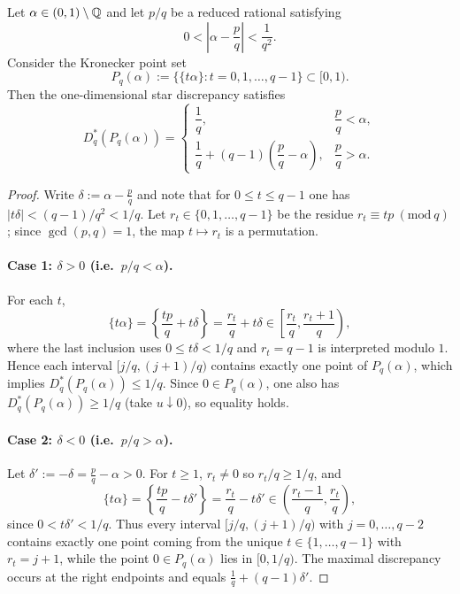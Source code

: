 \begin{proposition}
\label{prop:convergent_star_discrepancy}
Let $\alpha\in(0,1)\setminus\mathbb{Q}$ and let $p/q$ be a reduced rational satisfying
\begin{equation}
0<\left|\alpha-\frac{p}{q}\right|<\frac{1}{q^2}.
\end{equation}
Consider the Kronecker point set
\begin{equation}
P_q(\alpha):=\bigl\{\{t\alpha\}: t=0,1,\ldots,q-1\bigr\}\subset[0,1).
\end{equation}
Then the one-dimensional star discrepancy satisfies
\begin{equation}
D_q^*\!\left(P_q(\alpha)\right)=
\begin{cases}
\dfrac{1}{q}, & \dfrac{p}{q}<\alpha,\\[6pt]
\dfrac{1}{q}+(q-1)\!\left(\dfrac{p}{q}-\alpha\right), & \dfrac{p}{q}>\alpha.
\end{cases}
\end{equation}
\end{proposition}
\begin{proof}
Write $\delta:=\alpha-\frac{p}{q}$ and note that for $0\le t\le q-1$ one has $|t\delta|<(q-1)/q^2<1/q$.
Let $r_t\in\{0,1,\ldots,q-1\}$ be the residue $r_t\equiv tp\ (\mathrm{mod}\ q)$; since $\gcd(p,q)=1$, the map $t\mapsto r_t$ is a permutation.

\paragraph{Case 1: $\delta>0$ (i.e.\ $p/q<\alpha$).}
For each $t$,
\begin{equation}
\{t\alpha\}=\left\{\frac{tp}{q}+t\delta\right\}= \frac{r_t}{q}+t\delta \in \left[\frac{r_t}{q},\frac{r_t+1}{q}\right),
\end{equation}
where the last inclusion uses $0\le t\delta<1/q$ and $r_t=q-1$ is interpreted modulo $1$.
Hence each interval $[j/q,(j+1)/q)$ contains exactly one point of $P_q(\alpha)$, which implies $D_q^*(P_q(\alpha))\le 1/q$.
Since $0\in P_q(\alpha)$, one also has $D_q^*(P_q(\alpha))\ge 1/q$ (take $u\downarrow 0$), so equality holds.

\paragraph{Case 2: $\delta<0$ (i.e.\ $p/q>\alpha$).}
Let $\delta':=-\delta=\frac{p}{q}-\alpha>0$. For $t\ge 1$, $r_t\neq 0$ so $r_t/q\ge 1/q$, and
\begin{equation}
\{t\alpha\}=\left\{\frac{tp}{q}-t\delta'\right\}=\frac{r_t}{q}-t\delta' \in \left(\frac{r_t-1}{q},\frac{r_t}{q}\right),
\end{equation}
since $0<t\delta'<1/q$.
Thus every interval $[j/q,(j+1)/q)$ with $j=0,\ldots,q-2$ contains exactly one point coming from the unique $t\in\{1,\ldots,q-1\}$ with $r_t=j+1$, while the point $0\in P_q(\alpha)$ lies in $[0,1/q)$.
The maximal discrepancy occurs at the right endpoints and equals $\frac{1}{q}+(q-1)\delta'$.
\end{proof}

